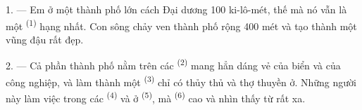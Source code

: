 %
%
%
%
%

\VUsaut{2.0mm}
\VUsaut{3.0mm}
\VUfilet{16mm}
\VUsaut{5.6mm}
\VUsaut{1.4mm}
\VUsaut{2.2mm}

\VUsaut{3.0mm}

1. --- Em ở một thành phố lớn cách Đại dương 100 ki-lô-mét, thế mà nó vẫn là một
 \textsuperscript{(1)} hạng nhất. Con sông chảy ven thành phố rộng 400 mét
và tạo thành một vũng đậu rất đẹp.

2. --- Cả phần thành phố nằm trên các  \textsuperscript{(2)} mang hẳn dáng
vẻ của biển và của công nghiệp, và làm thành một 
\textsuperscript{(3)} chỉ có thủy thủ và thợ thuyền ở. Những người này làm việc trong
các  \textsuperscript{(4)} và ở 
\textsuperscript{(5)}, mà  \textsuperscript{(6)} cao và  nhìn thấy từ rất xa.

